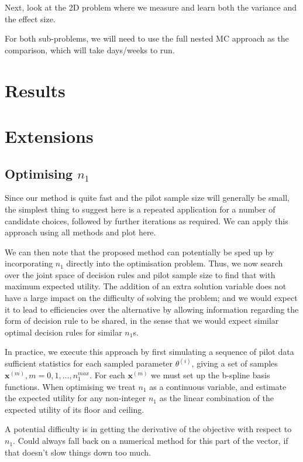 \documentclass[sagev, Crown]{sagej} %
\begin{document}
Next, look at the 2D problem where we measure and learn both the variance and the effect size.

For both sub-problems, we will need to use the full nested MC approach as the comparison, which will take days/weeks to run.

\section{Results}

\section{Extensions}

\subsection{Optimising $n_1$}

Since our method is quite fast and the pilot sample size will generally be small, the simplest thing to suggest here is a repeated application for a number of candidate choices, followed by further iterations as required. We can apply this approach using all methods and plot here. 

We can then note that the proposed method can potentially be sped up by incorporating $n_1$ directly into the optimisation problem. Thus, we now search over the joint space of decision rules and pilot sample size to find that with maximum expected utility. The addition of an extra solution variable does not have a large impact on the difficulty of solving the problem; and we would expect it to lead to efficiencies over the alternative by allowing information regarding the form of decision rule to be shared, in the sense that we would expect similar optimal decision rules for similar $n_1$s.

In practice, we execute this approach by first simulating a sequence of pilot data sufficient statistics for each sampled parameter $\theta^{(i)}$, giving a set of samples $\mathbf{x}^{(m)}, m = 0, 1, \ldots , n_1^{max}$. For each $\mathbf{x}^{(m)}$ we must set up the b-spline basis functions. When optimising we treat $n_1$ as a continuous variable, and estimate the expected utility for any non-integer $n_1$ as the linear combination of the expected utility of its floor and ceiling. 

A potential difficulty is in getting the derivative of the objective with respect to $n_1$. Could always fall back on a numerical method for this part of the vector, if that doesn't slow things down too much.
\end{document}
